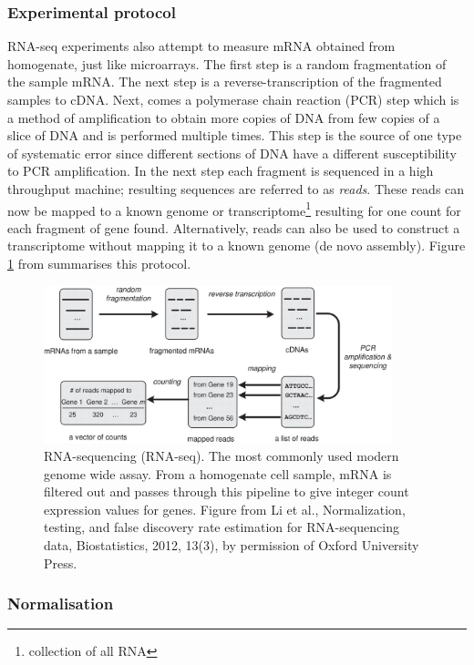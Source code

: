 \subsubsection{Experimental protocol}
\label{sec:technique-bio}

RNA-seq experiments also attempt to measure mRNA obtained from homogenate, just like microarrays. The first step is a random fragmentation of the sample mRNA. The next step is a reverse-transcription of the fragmented samples to cDNA. Next, comes a polymerase chain reaction (PCR) step which is a method of amplification to obtain more copies of DNA from few copies of a slice of DNA and is performed multiple times. This step is the source of one type of systematic error since different sections of  DNA have a different susceptibility to PCR amplification. In the next step each fragment is sequenced in a high throughput machine; resulting sequences are referred to as \emph{reads}. These reads can now be mapped to a known genome or transcriptome\footnote{collection of all RNA} resulting for one count for each fragment of gene found.  Alternatively, reads can also be used to construct a transcriptome without mapping it to a known genome (de novo assembly). Figure \ref{fig:li-biostats} from \cite{Li:2012ea} summarises this protocol.

\begin{figure}
  \centering
  \includegraphics[width=0.9\textwidth]{pics/li-biostats12.jpg}
  \caption{RNA-sequencing (RNA-seq). The most commonly used modern genome wide assay. From a homogenate cell sample, mRNA is filtered out and passes through this pipeline to give integer count expression values for genes. Figure from Li et al., Normalization, testing, and false discovery rate estimation for RNA-sequencing data, Biostatistics, 2012, 13(3), by permission of Oxford University Press.}
  \label{fig:li-biostats}
\end{figure}

\subsubsection{Normalisation}
\label{sec:normalisation}

